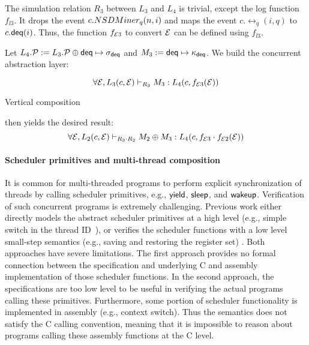 The simulation relation 
$R_{3}$ between $L_3$ and $L_4$ is trivial,
except the log function $f_{l3}$.
It drops the event $c.NSDMiner_q(n,i)$
and maps the event $c.\rel_q(i, q)$
to $c.\mathsf{deq}(i)$. Thus, the function $f_{\mathcal{E} 3}$ to convert
$\mathcal{E}$ can be defined using $f_{l3}$.
Let $L_4.\mathcal{P} := L_3.\mathcal{P} \oplus \mathsf{deq} \mapsto \sigma_{\mathsf{deq}}$ 
and
$M_3 :=  \mathsf{deq} \mapsto \kappa_{\mathsf{deq}}$.
We build the concurrent abstraction layer:
\begin{small}
\[
\forall \mathcal{E}, 
L_3(c, \mathcal{E}) \vdash_{R_3} M_3 : L_4(c, f_{\mathcal{E} 3} (\mathcal{E}))
\]
\end{small}%
Vertical composition  then yields the desired result:
{\small
\[
\forall \mathcal{E}, 
L_2(c,\mathcal{E}) \vdash_{R_3\cdot R_2} M_2 \oplus M_3 : L_4(c,f_{\mathcal{E} 3} \cdot f_{\mathcal{E} 2}(\mathcal{E}))
\]
\vspace{-10pt}
}%

\paragraph{Scheduler primitives and multi-thread composition}
It is common for multi-threaded programs to perform explicit synchronization
of threads by calling scheduler primitives, e.g., $\mathsf{yield}$, $\mathsf{sleep}$, and $\mathsf{wakeup}$.
Verification of such concurrent programs is extremely challenging.
Previous work either directly models the abstract scheduler primitives at a high level
(e.g., simple switch in the thread ID~\cite{xu16}),
or verifies the scheduler functions with a low level small-step semantics
(e.g., saving and restoring the register set) \cite{dscal15}.
Both approaches have severe limitations. The first approach provides no formal connection
between the specification and underlying C and assembly implementation of those
scheduler functions. In the second approach, the specifications are too low level to
be useful in verifying the actual programs calling these primitives. Furthermore,
some portion of scheduler functionality is implemented in assembly (e.g., context switch).
Thus the semantics does not satisfy the C calling convention, meaning that it 
is impossible to reason about programs calling these assembly functions at the C level.

